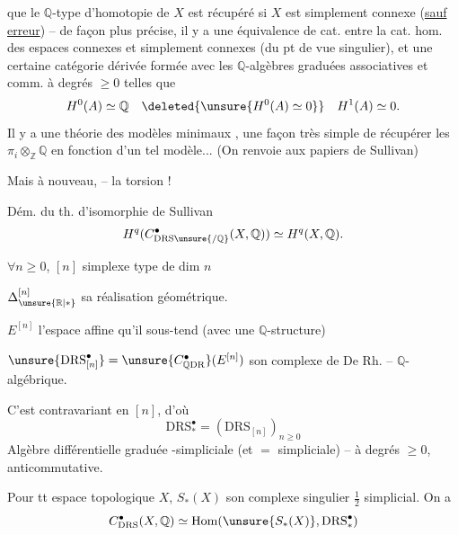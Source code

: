 que le $\mathbb Q$-type d'homotopie de $X$ est récupéré si $X$ est simplement connexe (\uline{sauf erreur}) -- de façon plus précise, il y a une équivalence de cat.  entre la cat. hom.  des espaces connexes et simplement connexes (du pt de vue singulier), et une certaine catégorie dérivée formée avec les $\mathbb Q$-algèbres graduées associatives et  comm.  à degrés $\geq 0$ telles que
\[
H^0(A)\simeq\mathbb Q\quad \deleted{\unsure{H^0(A)\simeq0}}\quad H^1(A)\simeq0.
\]
Il y a une théorie des modèles minimaux , une façon très simple de récupérer les $\pi_i\otimes_{\mathbb Z}\mathbb Q$ en fonction d'un tel modèle... (On renvoie aux papiers de Sullivan)

Mais à nouveau, --  la torsion !


Dém. du th. d'isomorphie de Sullivan
\[
H^q(C^\bullet_{\mathrm{DRS}\unsure{/\mathbb Q}}(X,\mathbb Q))\simeq H^q(X,\mathbb Q).
\]

$\forall n\geq0$, $[n]$ simplexe type de dim $n$

$\Delta^{[n]}_{\unsure{\mathbb R|*}}$ sa réalisation géométrique.

$E^{[n]}$ l'espace affine qu'il sous-tend (avec une $\mathbb Q$-structure)

$\unsure{\mathrm{DRS}^\bullet_{[n]}}=\unsure{C^\bullet_{\mathbb Q\mathrm{DR}}}(E^{[n]})$ son complexe de De Rh. -- $\mathbb Q$-algébrique.

C'est contravariant en $[n]$, d'où
\[
\mathrm{DRS}^\bullet_*=(\mathrm{DRS}_{[n]})_{n\geq0}
\]
Algèbre différentielle graduée -simpliciale (et $=$ simpliciale) -- à degrés $\geq0$, anticommutative.

Pour tt espace topologique $X$, $S_*(X)$ son complexe singulier $\frac12$ simplicial. On a
\[
C^\bullet_{\mathrm{DRS}}(X,\mathbb Q)\simeq\operatorname{Hom}(\unsure{S_*(X)},\mathrm{DRS}^\bullet_*)
\]
